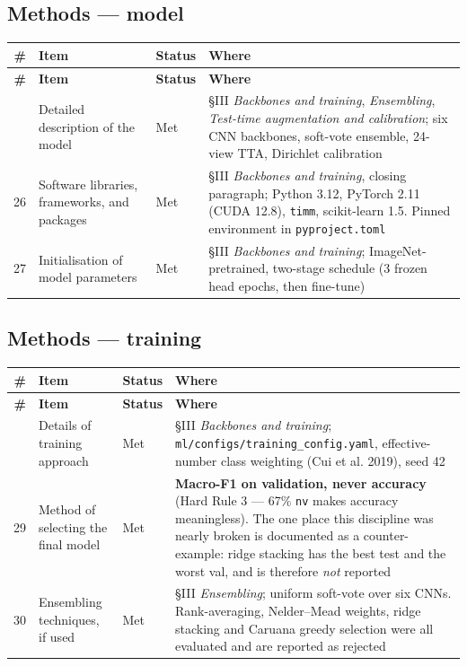 \subsection*{Methods --- model}


\begin{longtable}{@{}rp{}lp{}@{}}
\toprule
\textbf{\#} & \textbf{Item} & \textbf{Status} & \textbf{Where} \\
\midrule
\endfirsthead
\toprule
\textbf{\#} & \textbf{Item} & \textbf{Status} & \textbf{Where} \\
\midrule
\endhead
\bottomrule
\endfoot
25 & Detailed description of the model & Met & \S{}III \emph{Backbones and training}, \emph{Ensembling}, \emph{Test-time augmentation and calibration}; six CNN backbones, soft-vote ensemble, 24-view TTA, Dirichlet calibration \\
26 & Software libraries, frameworks, and packages & Met & \S{}III \emph{Backbones and training}, closing paragraph; Python 3.12, PyTorch 2.11 (CUDA 12.8), \texttt{timm}, scikit-learn 1.5. Pinned environment in \texttt{pyproject.toml} \\
27 & Initialisation of model parameters & Met & \S{}III \emph{Backbones and training}; ImageNet-pretrained, two-stage schedule (3 frozen head epochs, then fine-tune) \\
\end{longtable}


\subsection*{Methods --- training}


\begin{longtable}{@{}rp{}lp{}@{}}
\toprule
\textbf{\#} & \textbf{Item} & \textbf{Status} & \textbf{Where} \\
\midrule
\endfirsthead
\toprule
\textbf{\#} & \textbf{Item} & \textbf{Status} & \textbf{Where} \\
\midrule
\endhead
\bottomrule
\endfoot
28 & Details of training approach & Met & \S{}III \emph{Backbones and training}; \texttt{ml/configs/training\_config.yaml}, effective-number class weighting (Cui et al. 2019), seed 42 \\
29 & Method of selecting the final model & Met & \textbf{Macro-F1 on validation, never accuracy} (Hard Rule 3 --- 67\% \texttt{nv} makes accuracy meaningless). The one place this discipline was nearly broken is documented as a counter-example: ridge stacking has the best test and the worst val, and is therefore \emph{not} reported \\
30 & Ensembling techniques, if used & Met & \S{}III \emph{Ensembling}; uniform soft-vote over six CNNs. Rank-averaging, Nelder--Mead weights, ridge stacking and Caruana greedy selection were all evaluated and are reported as rejected \\
\end{longtable}


